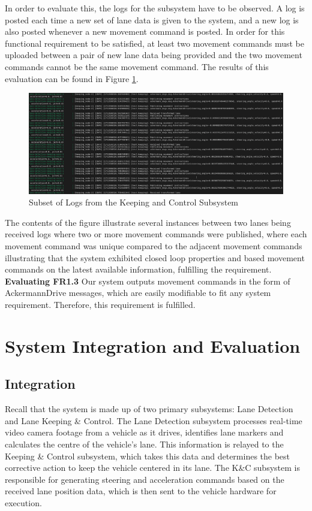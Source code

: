 \documentclass[titlepage, draft]{article}
\begin{document}
{In order to evaluate this, the logs for the subsystem have to be observed. A log is posted each time a new set of lane data is given to the system, and a new log is also posted whenever a new movement command is posted. In order for this functional requirement to be satisfied, at least two movement commands must be uploaded between a pair of new lane data being provided and the two movement commands cannot be the same movement command. The results of this evaluation can be found in Figure \ref{fig:fr23}.

\begin{figure}
	\centering
	\includegraphics[width=6in]{fr23}
	\caption{Subset of Logs from the Keeping and Control Subsystem }
	\label{fig:fr23}
\end{figure}

The contents of the figure illustrate several instances between two lanes being received logs where two or more movement commands were published, where each movement command was unique compared to the adjacent movement commands illustrating that the system exhibited closed loop properties and based movement commands on the latest available information, fulfilling the requirement. \\

\textbf{Evaluating FR1.3}
Our system outputs movement commands in the form of AckermannDrive messages, which are easily modifiable to fit any system requirement. Therefore, this requirement is fulfilled.


\section{System Integration and Evaluation}

\subsection{Integration}
Recall that the system is made up of two primary subsystems: Lane Detection and Lane Keeping \& Control. The Lane Detection subsystem processes real-time video camera footage from a vehicle as it drives, identifies lane markers and calculates the centre of the vehicle's lane. This information is relayed to the Keeping \& Control subsystem, which takes this data and determines the best corrective action to keep the vehicle centered in its lane. The K\&C subsystem is responsible for generating steering and acceleration commands based on the received lane position data, which is then sent to the vehicle hardware for execution.


}
\end{document}
